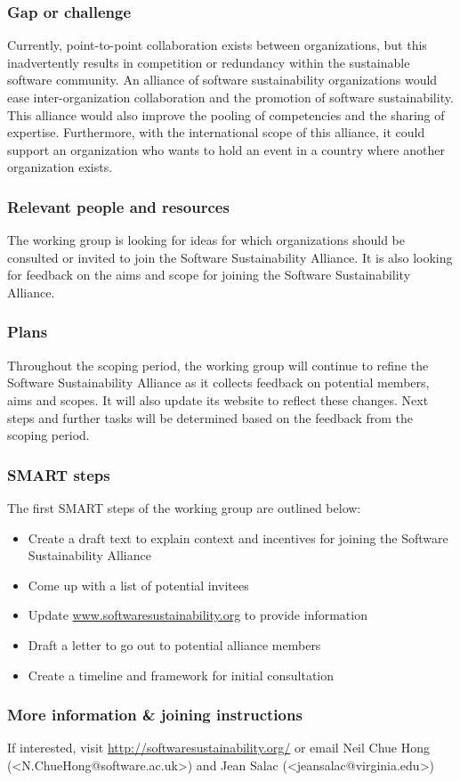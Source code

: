 \subsubsection{Gap or challenge}

Currently, point-to-point collaboration exists between organizations, but this inadvertently results in competition or redundancy within the sustainable software community. An alliance of software sustainability organizations would ease inter-organization collaboration and the promotion of software sustainability. This alliance would also improve the pooling of competencies and the sharing of expertise. Furthermore, with the international scope of this alliance, it could support an organization who wants to hold an event in a country where another organization exists.

\subsubsection{Relevant people and resources}

The working group is looking for ideas for which organizations should be consulted or invited to join the Software Sustainability Alliance. It is also looking for feedback on the aims and scope for joining the Software Sustainability Alliance.

\subsubsection{Plans}

Throughout the scoping period, the working group will continue to refine the Software Sustainability Alliance as it collects feedback on potential members, aims and scopes. It will also update its website to reflect these changes. Next steps and further tasks will be determined based on the feedback from the scoping period.

\subsubsection{SMART steps}

The first SMART steps of the working group are outlined below:
\begin{itemize}
\item Create a draft text to explain context and incentives for joining the Software Sustainability Alliance
\item Come up with a list of potential invitees
\item Update \url{www.softwaresustainability.org} to provide information
\item Draft a letter to go out to potential alliance members
\item Create a timeline and framework for initial consultation
\end{itemize}

\subsubsection{More information \& joining instructions}

If interested, visit \url{http://softwaresustainability.org/} or email Neil Chue Hong (<N.ChueHong@software.ac.uk>) and Jean Salac (<jeansalac@virginia.edu>)
